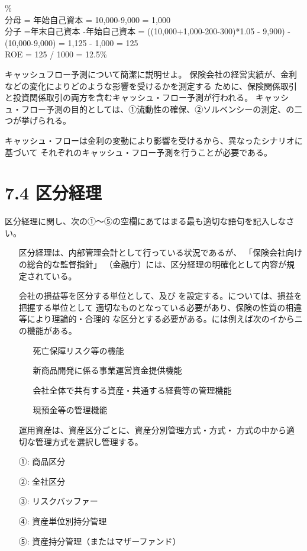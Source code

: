 \documentclass[report,gutter=10mm,fore-edge=10mm,uplatex,dvipdfmx]{jlreq}
\begin{document}
\answer{}
\%\\
分母 = 年始自己資本 = 10,000-9,000 = 1,000\\
分子 =年末自己資本 -年始自己資本 = ((10,000+1,000-200-300)*1.05 - 9,900) - (10,000-9,000) = 1,125 - 1,000 = 125\\
ROE = 125 / 1000 = 12.5\%

キャッシュフロー予測について簡潔に説明せよ。
\answer{}
保険会社の経営実績が、金利などの変化によりどのような影響を受けるかを測定する
ために、保険関係取引と投資関係取引の両方を含むキャッシュ・フロー予測が行われる。
キャッシュ・フロー予測の目的としては、①流動性の確保、②ソルベンシーの測定、の二
つが挙げられる。

キャッシュ・フローは金利の変動により影響を受けるから、異なったシナリオに基づいて
それぞれのキャッシュ・フロー予測を行うことが必要である。

\section{7.4 区分経理}
区分経理に関し、次の①～⑤の空欄にあてはまる最も適切な語句を記入しなさい。

\begin{itemize}
 \item[] 区分経理は、内部管理会計として行っている状況であるが、
 「保険会社向けの総合的な監督指針」
 （金融庁）には、区分経理の明確化として内容が規定されている。
 \item[] 会社の損益等を区分する単位として、及び
 を設定する。については、損益を把握する単位として
 適切なものとなっている必要があり、保険の性質の相違等により理論的・合理的
 な区分とする必要がある。には例えば次のイからニの機能がある。
\begin{itemize}
\item[] 死亡保障リスク等の機能
\item[] 新商品開発に係る事業運営資金提供機能
\item[] 会社全体で共有する資産・共通する経費等の管理機能
\item[] 現預金等の管理機能
\end{itemize} 
\item[] 運用資産は、資産区分ごとに、資産分別管理方式・方式・
 方式の中から適切な管理方式を選択し管理する。
\end{itemize}

\answer{}
\begin{itemize}
\item[ ①: ] 商品区分
\item[ ②: ] 全社区分
\item[ ③: ] リスクバッファー
\item[ ④: ] 資産単位別持分管理
\item[ ⑤: ] 資産持分管理（またはマザーファンド）
\end{itemize}
\end{document}
